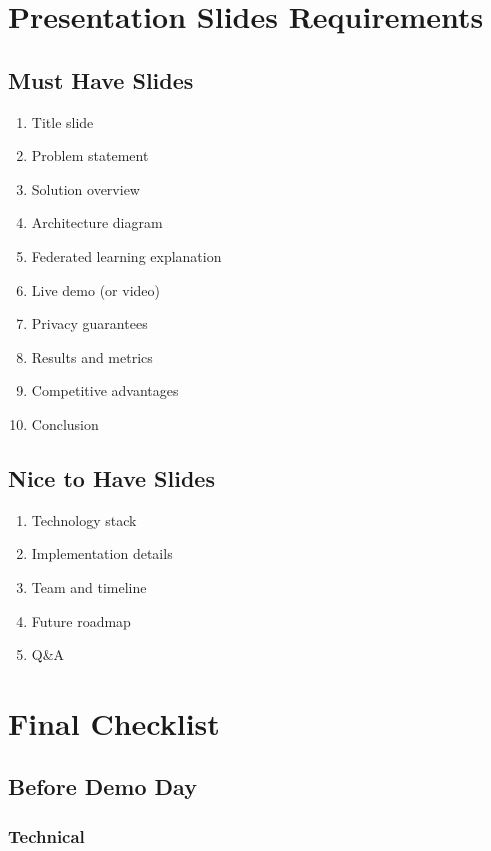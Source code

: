 \documentclass[11pt,a4paper]{article}
\begin{document}
\section{Presentation Slides Requirements}

\subsection{Must Have Slides}

\begin{enumerate}[leftmargin=*]
    \item Title slide
    \item Problem statement
    \item Solution overview
    \item Architecture diagram
    \item Federated learning explanation
    \item Live demo (or video)
    \item Privacy guarantees
    \item Results and metrics
    \item Competitive advantages
    \item Conclusion
\end{enumerate}

\subsection{Nice to Have Slides}

\begin{enumerate}[leftmargin=*]
    \item Technology stack
    \item Implementation details
    \item Team and timeline
    \item Future roadmap
    \item Q\&A
\end{enumerate}

\section{Final Checklist}

\subsection{Before Demo Day}

\subsubsection{Technical}
\end{document}
